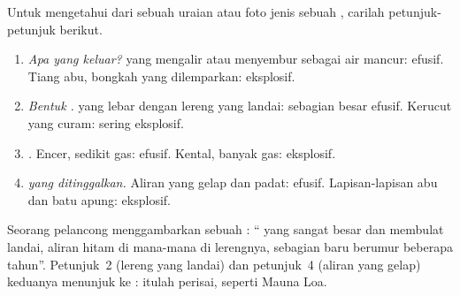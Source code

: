 \begin{method}\label{met:g7:volcanoes:clues}
Untuk mengetahui dari sebuah uraian atau foto jenis  sebuah , carilah petunjuk-petunjuk berikut.
\begin{enumerate}
  \item \emph{Apa yang keluar?}  yang mengalir atau menyembur sebagai
        air mancur: efusif. Tiang abu, bongkah  yang dilemparkan:
        eksplosif.
  \item \emph{Bentuk .}  yang lebar dengan lereng yang
        landai: sebagian besar  efusif. Kerucut yang curam: sering
        eksplosif.
  \item \emph{.} Encer, sedikit gas: efusif. Kental, banyak gas:
        eksplosif.
  \item \emph{ yang ditinggalkan.} Aliran  yang gelap dan padat:
        efusif. Lapisan-lapisan abu dan batu apung: eksplosif.
\end{enumerate}
\end{method}

\begin{example}\label{ex:g7:volcanoes:clues}
Seorang pelancong menggambarkan sebuah : `` yang sangat
besar dan membulat landai, aliran  hitam di mana-mana di lerengnya,
sebagian baru berumur beberapa tahun''. Petunjuk~2 (lereng yang landai) dan
petunjuk~4 (aliran  yang gelap) keduanya menunjuk ke :
itulah  perisai, seperti Mauna Loa.
\end{example}

